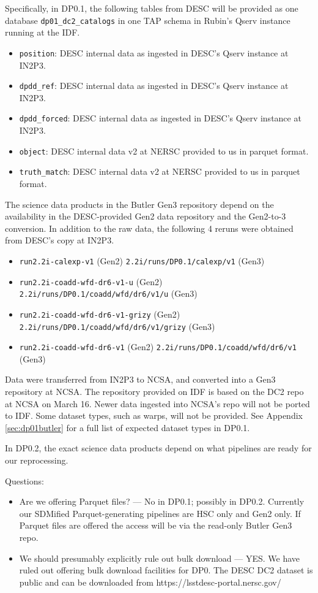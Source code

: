 Specifically, in DP0.1, the following tables from DESC will be provided as one database \texttt{dp01\_dc2\_catalogs} in one TAP schema in Rubin's Qserv instance running at the IDF.
\begin{itemize}
\item \texttt{position}: DESC internal data as ingested in DESC's Qserv instance at IN2P3.
\item \texttt{dpdd\_ref}: DESC internal data as ingested in DESC's Qserv instance at IN2P3.
\item \texttt{dpdd\_forced}: DESC internal data as ingested in DESC's Qserv instance at IN2P3.
\item \texttt{object}: DESC internal data v2 at NERSC provided to us in parquet format.
\item \texttt{truth\_match}: DESC internal data v2 at NERSC provided to us in parquet format.
\end{itemize}

The science data products in the Butler Gen3 repository depend on the availability in the DESC-provided Gen2 data repository and the Gen2-to-3 conversion.
In addition to the raw data, the following 4 reruns were obtained from DESC's copy at IN2P3.
\begin{itemize}
\item \texttt{run2.2i-calexp-v1} (Gen2) \texttt{2.2i/runs/DP0.1/calexp/v1} (Gen3)
\item \texttt{run2.2i-coadd-wfd-dr6-v1-u} (Gen2) \texttt{2.2i/runs/DP0.1/coadd/wfd/dr6/v1/u} (Gen3)
\item \texttt{run2.2i-coadd-wfd-dr6-v1-grizy} (Gen2) \texttt{2.2i/runs/DP0.1/coadd/wfd/dr6/v1/grizy} (Gen3)
\item \texttt{run2.2i-coadd-wfd-dr6-v1} (Gen2) \texttt{2.2i/runs/DP0.1/coadd/wfd/dr6/v1} (Gen3)
\end{itemize}

Data were transferred from IN2P3 to NCSA, and converted into a Gen3 repository at NCSA.
The repository provided on IDF is based on the DC2 repo at NCSA on March 16.
Newer data ingested into NCSA's repo will not be ported to IDF.
Some dataset types, such as warps, will not be provided.
See Appendix \ref{sec:dp01butler} for a full list of expected dataset types in DP0.1.


In DP0.2, the exact science data products depend on what pipelines are ready for our reprocessing.

Questions:

\begin{itemize}

\item Are we offering Parquet files? --- No in DP0.1; possibly in DP0.2. Currently our SDMified Parquet-generating pipelines are HSC only and Gen2 only. If Parquet files are offered the access will be via the read-only Butler Gen3 repo.

\item We should presumably explicitly rule out bulk download  --- YES.
We have ruled out offering bulk download facilities for DP0.
The DESC DC2 dataset is public and can be downloaded from https://lsstdesc-portal.nersc.gov/

\end{itemize}

